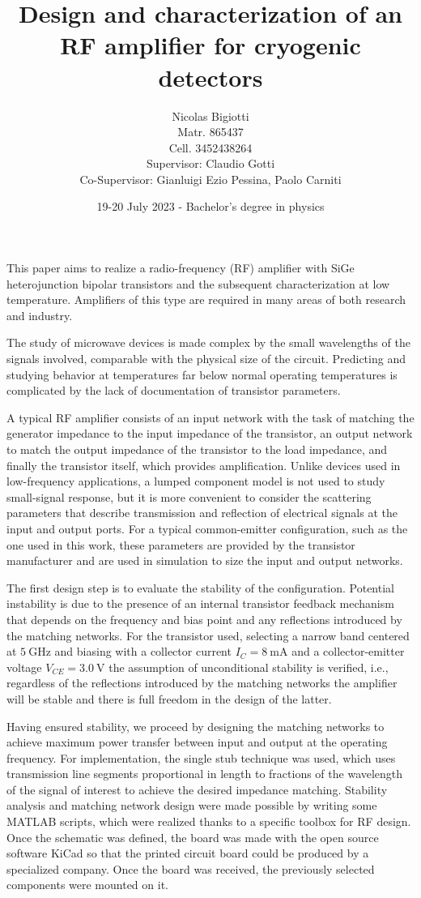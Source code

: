 \documentclass[12pt]{article}
\title{Design and characterization of an RF amplifier for
cryogenic detectors}
\author{Nicolas Bigiotti\\{\small Matr. 865437}\\{\small Cell. 3452438264 }\\[0.4cm]{\small Supervisor: Claudio Gotti}\\{\small Co-Supervisor: Gianluigi Ezio Pessina, Paolo Carniti}}
\date{19-20 July 2023 - Bachelor's degree in physics}
\begin{document}
\maketitle


This paper aims to realize a radio-frequency (RF) amplifier with SiGe heterojunction bipolar transistors and the subsequent characterization at low temperature. Amplifiers of this type are required in many areas of both research and industry.

The study of microwave devices is made complex by the small wavelengths of the signals involved, comparable with the physical size of the circuit. Predicting and studying behavior at temperatures far below normal operating temperatures is complicated by the lack of documentation of transistor parameters.

A typical RF amplifier consists of an input network with the task of matching the generator impedance to the input impedance of the transistor, an output network to match the output impedance of the transistor to the load impedance, and finally the transistor itself, which provides amplification. Unlike devices used in low-frequency applications, a lumped component model is not used to study small-signal response, but it is more convenient to consider the scattering parameters that describe transmission and reflection of electrical signals at the input and output ports. For a typical common-emitter configuration, such as the one used in this work, these parameters are provided by the transistor manufacturer and are used in simulation to size the input and output networks.


The first design step is to evaluate the stability of the configuration. Potential instability is due to the presence of an internal transistor feedback mechanism that depends on the frequency and bias point and any reflections introduced by the matching networks. For the transistor used, selecting a narrow band centered at $\SI{5}{\giga\hertz}$ and biasing with a collector current $I_{C}=\SI{8}{\milli\ampere}$ and a collector-emitter voltage $V_{CE}=\SI{3. 0}{\volt}$ the assumption of unconditional stability is verified, i.e., regardless of the reflections introduced by the matching networks the amplifier will be stable and there is full freedom in the design of the latter.

Having ensured stability, we proceed by designing the matching networks to achieve maximum power transfer between input and output at the operating frequency. For implementation, the single stub technique was used, which uses transmission line segments proportional in length to fractions of the wavelength of the signal of interest to achieve the desired impedance matching. Stability analysis and matching network design were made possible by writing some MATLAB scripts, which were realized thanks to a specific toolbox for RF design.
Once the schematic was defined, the board was made with the open source software KiCad so that the printed circuit board could be produced by a specialized company. Once the board was received, the previously selected components were mounted on it.
\end{document}
